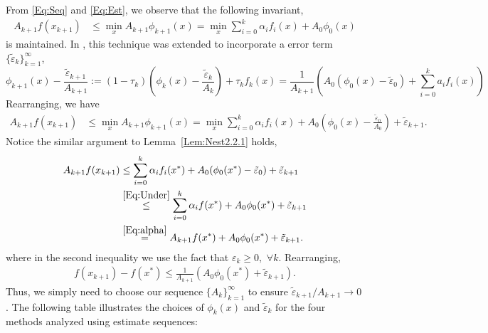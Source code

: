 \documentclass[11pt]{article}
\theoremstyle{plain}
\begin{document}
\noindent From \eqref{Eq:Seq} and \eqref{Eq:Est}, we observe that the following  invariant,
\begin{align}\label{Eq:EstSeqInv}
A_{k+1} f(x_{k+1}) &\leq \min_x A_{k+1} \phi_{k+1}(x) = \min_x  \sum_{i=0}^k \alpha_i f_i(x) +  A_0\phi_0(x)
\end{align}
is maintained. In \cite{Nesterov15, NesterovCond15}, this technique was extended to incorporate a error term $\{\tilde \varepsilon_k\}_{k=1}^\infty$,
\begin{equation}\label{Eq:Est2}
\phi_{k+1}(x) - \frac{\tilde \varepsilon_{k+1}}{A_{k+1}} := (1 - \tau_k) \left(\phi_k(x) - \frac{\tilde \varepsilon_{k}}{A_k}\right) + \tau_k f_k(x) = \frac{1}{A_{k+1}} \left(A_0(\phi_0(x) - \tilde \varepsilon_0) + \sum_{i=0}^k a_i f_i(x)\right) 
\end{equation}
Rearranging, we have
\begin{align}\label{Eq:EstSeqInv2}
A_{k+1} f(x_{k+1}) &\leq \min_x A_{k+1}\phi_{k+1}(x) = \min_x  \sum_{i=0}^k \alpha_i f_i(x) +  A_0\left(\phi_0(x) - \frac{\tilde \varepsilon_0}{A_0}\right) + \tilde \varepsilon_{k+1}.
\end{align}
Notice the similar argument to Lemma~\ref{Lem:Nest2.2.1} holds,
\begin{subequations}\label{Eq:EstSeqErr}
\begin{align}
A_{k+1} f(x_{k+1}) &\leq \sum_{i=0}^k \alpha_i f_i(x^\ast) + A_0 (\phi_0(x^\ast) - \tilde \varepsilon_0)  + \tilde \varepsilon_{k+1}\notag\\
&\overset{\eqref{Eq:Under}}{\leq} \sum_{i=0}^k \alpha_i f(x^\ast) +  A_0\phi_0(x^\ast)  + \tilde \varepsilon_{k+1}\notag\\
& \overset{\eqref{Eq:alpha}}{=} A_{k+1} f(x^\ast) +  A_0\phi_0(x^\ast) + \tilde \varepsilon_{k+1}.
\end{align}
\end{subequations}
where in the second inequality we use the fact that $\varepsilon_k \geq 0,\,\, \forall k$. Rearranging,
\begin{align*}
f(x_{k+1}) - f(x^\ast) \leq \frac{1}{A_{k+1}}\left(A_0\phi_0(x^\ast)  + \tilde \varepsilon_{k+1}\right).
\end{align*}
Thus, we simply need to choose our sequence $\{A_k\}_{k=1}^\infty$ to ensure $\tilde \varepsilon_{k+1}/ A_{k+1} \rightarrow 0$. The following table illustrates the choices of $\phi_k(x)$ and $\tilde \varepsilon_k$ for the four methods analyzed using estimate sequences: 
\end{document}
